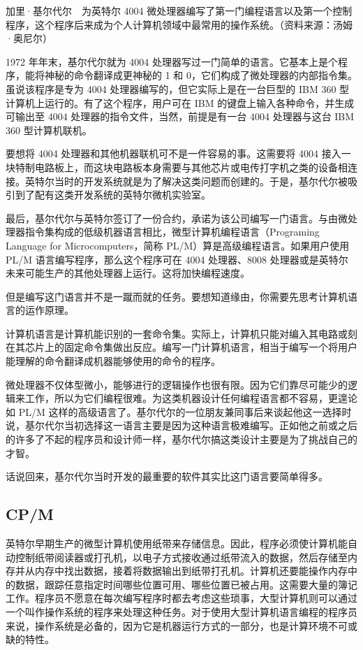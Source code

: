 \documentclass[12pt,UTF8]{ctexbook}
\begin{document}
加里·基尔代尔　为英特尔 4004 微处理器编写了第一门编程语言以及第一个控制程序，这个程序后来成为个人计算机领域中最常用的操作系统。（资料来源：汤姆·奥尼尔）

1972 年年末，基尔代尔就为 4004 处理器写过一门简单的语言。它基本上是个程序，能将神秘的命令翻译成更神秘的 1 和 0，它们构成了微处理器的内部指令集。虽说该程序是专为 4004 处理器编写的，但它实际上是在一台巨型的 IBM 360 型计算机上运行的。有了这个程序，用户可在 IBM 的键盘上输入各种命令，并生成可输出至 4004 处理器的指令文件，当然，前提是有一台 4004 处理器与这台 IBM 360 型计算机联机。

要想将 4004 处理器和其他机器联机可不是一件容易的事。这需要将 4004 接入一块特制电路板上，而这块电路板本身需要与其他芯片或电传打字机之类的设备相连接。英特尔当时的开发系统就是为了解决这类问题而创建的。于是，基尔代尔被吸引到了配有这类开发系统的英特尔微机实验室。

最后，基尔代尔与英特尔签订了一份合约，承诺为该公司编写一门语言。与由微处理器指令集构成的低级机器语言相比，微型计算机编程语言（Programing Language for Microcomputers，简称 PL/M）算是高级编程语言。如果用户使用 PL/M 语言编写程序，那么这个程序可在 4004 处理器、8008 处理器或是英特尔未来可能生产的其他处理器上运行。这将加快编程速度。

但是编写这门语言并不是一蹴而就的任务。要想知道缘由，你需要先思考计算机语言的运作原理。

计算机语言是计算机能识别的一套命令集。实际上，计算机只能对编入其电路或刻在其芯片上的固定命令集做出反应。编写一门计算机语言，相当于编写一个将用户能理解的命令翻译成机器能够使用的命令的程序。

微处理器不仅体型微小，能够进行的逻辑操作也很有限。因为它们靠尽可能少的逻辑来工作，所以为它们编程很难。为这类机器设计任何编程语言都不容易，更遑论如 PL/M 这样的高级语言了。基尔代尔的一位朋友兼同事后来谈起他这一选择时说，基尔代尔当初选择这一语言主要是因为这种语言极难编写。正如他之前或之后的许多了不起的程序员和设计师一样，基尔代尔搞这类设计主要是为了挑战自己的才智。

话说回来，基尔代尔当时开发的最重要的软件其实比这门语言要简单得多。





\subsection{CP/M}


英特尔早期生产的微型计算机使用纸带来存储信息。因此，程序必须使计算机能自动控制纸带阅读器或打孔机，以电子方式接收通过纸带流入的数据，然后存储至内存并从内存中找出数据，接着将数据输出到纸带打孔机。计算机还要能操作内存中的数据，跟踪任意指定时间哪些位置可用、哪些位置已被占用。这需要大量的簿记工作。程序员不愿意在每次编写程序时都去考虑这些琐事，大型计算机则可以通过一个叫作操作系统的程序来处理这种任务。对于使用大型计算机语言编程的程序员来说，操作系统是必备的，因为它是机器运行方式的一部分，也是计算环境不可或缺的特性。
\end{document}

